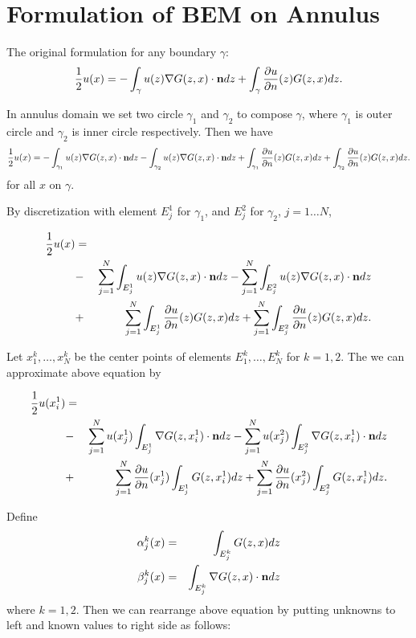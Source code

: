 \section{Formulation of BEM on Annulus}
The original formulation for any boundary $\gamma$:
\begin{eqnarray}
\frac{1}{2}u(x) = -\int_{\gamma} u(z) \nabla G(z,x)\cdot {\bf n}
dz + \int_{\gamma} \frac{\partial u}{\partial n}(z) G(z, x) dz.
\end{eqnarray}

In annulus domain we set two circle $\gamma_1$ and $\gamma_2$ to
compose $\gamma$, where $\gamma_1$ is outer circle and $\gamma_2$
is inner circle respectively. Then we have
\begin{eqnarray}
\frac{1}{2}u(x) = -\int_{\gamma_1} u(z) \nabla G(z,x) \cdot {\bf
n} dz -\int_{\gamma_2} u(z) \nabla G(z,x) \cdot {\bf n}dz +
\int_{\gamma_1} \frac{\partial u}{\partial n}(z) G(z, x) dz +
\int_{\gamma_2} \frac{\partial u}{\partial n}(z) G(z, x) dz.
\end{eqnarray}
for all $x$ on $\gamma$.

By discretization with element $E_j^1$ for $\gamma_1$, and $E_j^2$
for $\gamma_2$, $j=1 \dots N$,

\begin{eqnarray}
\frac{1}{2}u(x) &=& \\
&-&\sum_{j=1}^{N}\int_{E_j^1} u(z) \nabla G(z,x) \cdot {\bf n}dz
-\sum_{j=1}^{N}\int_{E_j^2} u(z) \nabla G(z,x) \cdot {\bf n}dz \\
&+& \sum_{j=1}^{N}\int_{E_j^1} \frac{\partial u}{\partial n}(z)
G(z, x) dz + \sum_{j=1}^{N}\int_{E_j^2} \frac{\partial u}{\partial
n}(z) G(z, x) dz.
\end{eqnarray}

Let ${x_1^k, \dots, x_N^k}$ be the center points of elements
${E_1^k, \dots, E_N^k}$ for $k=1,2$. The we can approximate above
equation by

\begin{eqnarray}
\frac{1}{2}u(x_i^1) &=& \\
&-&\sum_{j=1}^{N}u(x_j^1)\int_{E_j^1}  \nabla G(z,x_i^1) \cdot
{\bf n}dz
-\sum_{j=1}^{N}u(x_j^2)\int_{E_j^2}  \nabla G(z,x_i^1)\cdot {\bf n} dz \\
&+& \sum_{j=1}^{N}\frac{\partial u}{\partial n}(x_j^1)\int_{E_j^1}
G(z, x_i^1) dz + \sum_{j=1}^{N}\frac{\partial u}{\partial
n}(x_j^2)\int_{E_j^2}  G(z, x_i^1) dz.
\end{eqnarray}

\newpage
Define
\begin{eqnarray}
\alpha^k_j(x) &=& \int_{E_j^k}G(z,x)dz\\
\beta^k_j(x) &=& \int_{E_j^k}\nabla G(z,x)\cdot {\bf n}dz
\end{eqnarray}
where $k=1,2$. Then we can rearrange above equation by putting
unknowns to left and known values to right side as follows:

